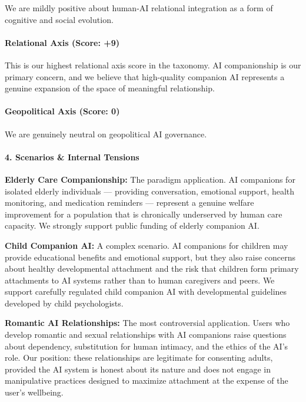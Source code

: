 We are mildly positive about human-AI relational integration as a form
of cognitive and social evolution.

\paragraph{Relational Axis (Score: +9)}\label{relational-axis-score-9}

This is our highest relational axis score in the taxonomy. AI
companionship is our primary concern, and we believe that high-quality
companion AI represents a genuine expansion of the space of meaningful
relationship.

\paragraph{Geopolitical Axis (Score:
0)}\label{geopolitical-axis-score-0-2}

We are genuinely neutral on geopolitical AI governance.

\paragraph{4. Scenarios \& Internal
Tensions}\label{scenarios-internal-tensions-31}

\textbf{Elderly Care Companionship:} The paradigm application. AI
companions for isolated elderly individuals --- providing conversation,
emotional support, health monitoring, and medication reminders ---
represent a genuine welfare improvement for a population that is
chronically underserved by human care capacity. We strongly support
public funding of elderly companion AI.

\textbf{Child Companion AI:} A complex scenario. AI companions for
children may provide educational benefits and emotional support, but
they also raise concerns about healthy developmental attachment and the
risk that children form primary attachments to AI systems rather than to
human caregivers and peers. We support carefully regulated child
companion AI with developmental guidelines developed by child
psychologists.

\textbf{Romantic AI Relationships:} The most controversial application.
Users who develop romantic and sexual relationships with AI companions
raise questions about dependency, substitution for human intimacy, and
the ethics of the AI's role. Our position: these relationships are
legitimate for consenting adults, provided the AI system is honest about
its nature and does not engage in manipulative practices designed to
maximize attachment at the expense of the user's wellbeing.


